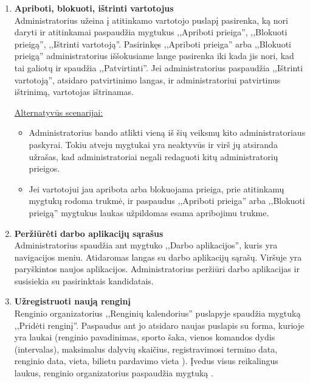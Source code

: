 \documentclass{VUMIFPSkursinis}
\begin{document}
\begin{enumerate} [label = \textbf{U\arabic*.}]
					\underline{Alternatyvūs scenarijai:}
					\begin{itemize}
						\item Administratorius spaudžia mygtuką ,,Ištrinti'' ir uždaro patvirtinimo langą. Vaizdo įrašas nėra ištrinamas.
					\end{itemize}
					
			\item \textbf{Apriboti, blokuoti, ištrinti vartotojus}   \\
					Administratorius užeina į atitinkamo vartotojo puslapį pasirenka, ką nori daryti ir atitinkamai paspaudžia mygtukus ,,Apriboti prieiga'', ,,Blokuoti prieigą'', ,,Ištrinti vartotoją''. Pasirinkęs ,,Apriboti prieiga'' arba ,,Blokuoti prieigą'' administratorius iššokusiame lange pasirenka iki kada jis nori, kad tai galiotų ir spaudžia ,,Patvirtinti''. Jei administratorius paspaudžia ,,Ištrinti vartotoją'', atsidaro patvirtinimo langas, ir administratoriui patvirtinus ištrinimą, vartotojas ištrinamas.
					
					\underline{Alternatyvūs scenarijai:}
					\begin{itemize}
						\item Administratorius bando atlikti vieną iš šių veiksmų kito administratoriaus paskyrai. Tokiu atveju mygtukai yra neaktyvūs ir virš jų atsiranda užrašas, kad administratoriai negali redaguoti kitų administratorių prieigos.
						\item Jei vartotojui jau apribota arba blokuojama prieiga, prie atitinkamų mygtukų rodoma trukmė, ir paspaudus ,,Apriboti prieiga'' arba ,,Blokuoti prieigą'' mygtukus laukas užpildomas esama apribojimu trukme.						
					\end{itemize}
				
			\item \textbf{Peržiūrėti darbo aplikacijų sąrašus}   \\
					Administratorius spaudžia ant mygtuko ,,Darbo aplikacijos'', kuris yra navigacijos meniu. Atidaromas langas su darbo aplikacijų sąrašų. Viršuje yra paryškintos naujos aplikacijos. Administratorius peržiūri darbo aplikacijas ir susisiekia su pasirinktais kandidatais.

			\item \textbf{Užregistruoti naują renginį}   \\
					Renginio organizatorius ,,Renginių kalendorius'' puslapyje spaudžia mygtuką ,,Pridėti renginį''. Paspaudus ant jo atsidaro naujas puslapis su forma, kurioje yra laukai (renginio pavadinimas, sporto šaka, vienos komandos dydis (intervalas), maksimalus dalyvių skaičius, registravimosi termino data, renginio data, vieta, bilietu pardavimo vieta ). Įvedus visus reikalingus laukus, renginio organizatorius paspaudžia mygtuką .
					

\end{enumerate}
\end{document}
